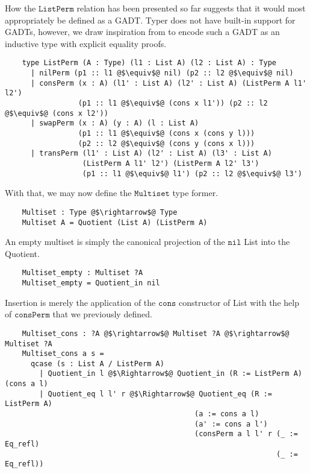 \documentclass[12pt,twoside,maitrise]{dms}
\theoremstyle{definition}
\numberwithin{equation}{section}
\numberwithin{table}{chapter}
\numberwithin{figure}{chapter}
\newcommand\fn[1] {\texttt{#1}}
\begin{document}
How the $\fn{ListPerm}$ relation has been presented so far suggests that it
would most appropriately be defined as a GADT\@. Typer does not have built-in
support for GADTs, however, we draw inspiration from\cite{sulzmann2007systemfeq}
to encode such a GADT as an inductive type with explicit equality proofs.

\begin{verbatim}
    type ListPerm (A : Type) (l1 : List A) (l2 : List A) : Type
      | nilPerm (p1 :: l1 @$\equiv$@ nil) (p2 :: l2 @$\equiv$@ nil)
      | consPerm (x : A) (l1' : List A) (l2' : List A) (ListPerm A l1' l2')
                 (p1 :: l1 @$\equiv$@ (cons x l1')) (p2 :: l2 @$\equiv$@ (cons x l2'))
      | swapPerm (x : A) (y : A) (l : List A)
                 (p1 :: l1 @$\equiv$@ (cons x (cons y l)))
                 (p2 :: l2 @$\equiv$@ (cons y (cons x l)))
      | transPerm (l1' : List A) (l2' : List A) (l3' : List A)
                  (ListPerm A l1' l2') (ListPerm A l2' l3')
                  (p1 :: l1 @$\equiv$@ l1') (p2 :: l2 @$\equiv$@ l3')
\end{verbatim}

With that, we may now define the $\fn{Multiset}$ type former.

\begin{verbatim}
    Multiset : Type @$\rightarrow$@ Type
    Multiset A = Quotient (List A) (ListPerm A)
\end{verbatim}

An empty multiset is simply the canonical projection of the $\fn{nil}$ List into
the Quotient.

\begin{verbatim}
    Multiset_empty : Multiset ?A
    Multiset_empty = Quotient_in nil
\end{verbatim}

Insertion is merely the application of the $\fn{cons}$ constructor of List with the help
of $\fn{consPerm}$ that we previously defined.

\begin{verbatim}
    Multiset_cons : ?A @$\rightarrow$@ Multiset ?A @$\rightarrow$@ Multiset ?A
    Multiset_cons a s =
      qcase (s : List A / ListPerm A)
        | Quotient_in l @$\Rightarrow$@ Quotient_in (R := ListPerm A) (cons a l)
        | Quotient_eq l l' r @$\Rightarrow$@ Quotient_eq (R := ListPerm A)
                                            (a := cons a l)
                                            (a' := cons a l')
                                            (consPerm a l l' r (_ := Eq_refl)
                                                               (_ := Eq_refl))
\end{verbatim}
\end{document}
